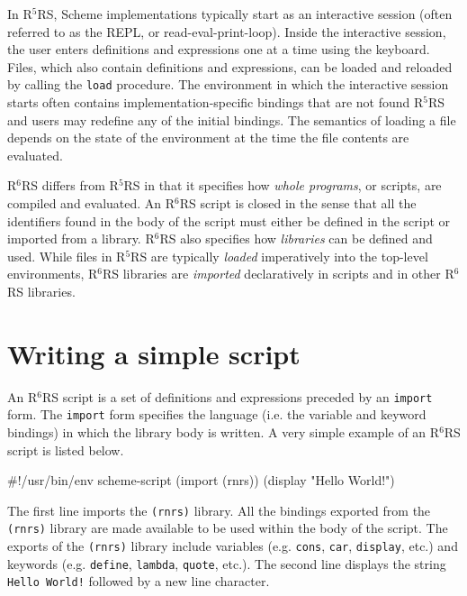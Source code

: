 \documentclass[onecolumn, 12pt, twoside, openright, dvipdfm]{book}
\newcommand{\rnrs}[1]{R$^{\mathrm{#1}}$RS}
\begin{document}
In \rnrs{5}, Scheme implementations typically start as an
interactive session (often referred to as the REPL, or
read-eval-print-loop).  Inside the interactive session, the user
enters definitions and expressions one at a time using the keyboard.
Files, which also contain definitions and expressions, can be loaded
and reloaded by calling the \texttt{load} procedure.  The
environment in which the interactive session starts often contains
implementation-specific bindings that are not found \rnrs{5} and
users may redefine any of the initial bindings.  The semantics of 
loading a file depends on the state of the environment at the time
the file contents are evaluated.

\index{R6RS Script@\rnrs{6} Script!Import} 
%
\rnrs{6} differs from \rnrs{5} in that it specifies how \emph{whole
programs}, or scripts, are compiled and evaluated.  An \rnrs{6}
script is closed in the sense that all the identifiers found in the
body of the script must either be defined in the script or imported
from a library.  \rnrs{6} also specifies how \emph{libraries} can be
defined and used.  While files in \rnrs{5} are typically
\emph{loaded} imperatively into the top-level environments, \rnrs{6}
libraries are \emph{imported} declaratively in scripts and in other
\rnrs{6} libraries. 

\section{\label{sec:scripts}Writing a simple script}

An \rnrs{6} script is a set of definitions and expressions preceded
by an \texttt{import} form.  The \texttt{import} form specifies
the language (i.e. the variable and keyword bindings) in which the
library body is written.  A very simple example of an \rnrs{6}
script is listed below.

\begin{CodeInline}
#!/usr/bin/env scheme-script
(import (rnrs))
(display "Hello World!\n")
\end{CodeInline}

The first line imports the \texttt{(rnrs)} library.  All the
bindings exported from the \texttt{(rnrs)} library are made
available to be used within the body of the script.  
The exports of the \texttt{(rnrs)} library include variables
(e.g. \texttt{cons}, \texttt{car}, \texttt{display}, etc.) and
keywords (e.g.  \texttt{define}, \texttt{lambda}, \texttt{quote},
etc.).  The second line displays the string \texttt{Hello World!}
followed by a new line character.
\end{document}
